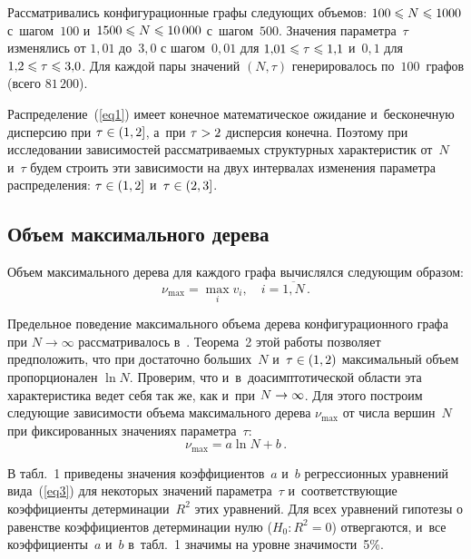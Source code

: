 \begin{multicols}{2}
Рассматривались конфигурационные графы следующих объемов: $100\hm\leqslant N\hm\leqslant 1000$ 
с~шагом~$100$ и~$1500\hm\leqslant N\hm\leqslant 10\,000$ с~шагом~$500$. Значения параметра~$\tau$ изменялись от 
$1{,}01$ до~$3{,}0$
с шагом~$0{,}01$ для $1{,}01\hm\leqslant\tau\hm\leqslant 1{,}1$ и~$0{,}1$ для $1{,}2\hm\leqslant\tau\hm\leqslant 3{,}0$. Для 
каждой пары значений $(N,\tau)$ генерировалось по~$100$~графов (всего 
$81\,200$).

Распределение~(\ref{eq1}) имеет конечное математическое ожидание и~бесконечную 
дисперсию
при $\tau\hm\in(1,2]$, а~при $\tau\hm>2$ дисперсия конечна.
Поэтому при исследовании зависимостей рас\-смат\-ри\-ва\-емых структурных характеристик 
от~$N$ и~$\tau$ будем строить эти зависимости на двух интервалах изменения 
параметра распределения: $\tau\hm\in(1,2]$ и~$\tau\hm\in(2,3]$.

\vspace*{-6pt}

\subsection{Объем максимального дерева}

Объем максимального дерева для каждого графа вычислялся следующим образом:
\begin{equation*}
\nu_{\max}=\max\limits_{i}v_i, \quad i=\overline{1,N}\,.
\end{equation*}

Предельное поведение максимального объема дерева конфигурационного графа при 
$N\rightarrow\infty$ рассматривалось в~\cite{Pav}. Теорема~2 этой работы позволяет предположить, что при достаточно больших~$N$ и~$\tau\hm\in (1,2)$ максимальный объем пропорционален $\ln N$.
Проверим, что и~в~доасимптотической области эта характеристика ведет себя так 
же, как и~при $N\hm\rightarrow\infty$. Для этого построим следующие зависимости 
объема максимального дерева $\nu_{\max}$ от
числа вершин~$N$ при фиксированных значениях параметра~$\tau$:
\begin{equation}
\label{eq3}
\nu_{\max} = a \ln N + b\,.
\end{equation}

\noindent В табл.~1 приведены значения коэффициентов~$a$ и~$b$ регрессионных 
уравнений вида~(\ref{eq3})
для некоторых значений параметра~$\tau$ и~соответствующие коэффициенты 
детерминации~$R^2$ этих уравнений. Для всех уравнений гипотезы о равенстве 
коэффициентов детерминации нулю ($H_0: R^2=0$) отвергаются, и~все коэффициенты~$a$ 
и~$b$ в~табл.~1 значимы на уровне значимости~5\%.







\end{multicols}
